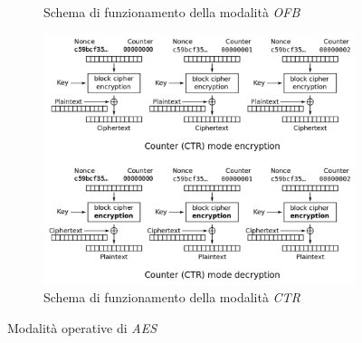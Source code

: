 \begin{figure}[h!b]
\begin{subfigure}{0.48\textwidth}
        \caption{Schema di funzionamento della modalità \emph{OFB}}
        \label{fig:aes-ofb}
    \end{subfigure}
    \centering
    \begin{subfigure}{0.48\textwidth}
        \includegraphics[width=1\textwidth]{capitoli/figure-crittografia/aes-ctr.png}
        \caption{Schema di funzionamento della modalità \emph{CTR}}
        \label{fig:aes-ctr}
    \end{subfigure}
    \caption{Modalità operative di \emph{AES}}
    \label{fig:aes-modes}
\end{figure}


